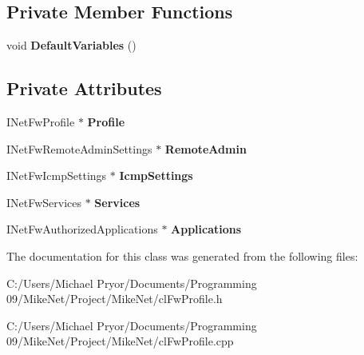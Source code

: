 \subsection*{Private Member Functions}
\begin{DoxyCompactItemize}
\item 
\hypertarget{classcl_fw_profile_a8700995a9f6c3439cbb0b1fefe321dfd}{
void {\bfseries DefaultVariables} ()}
\label{classcl_fw_profile_a8700995a9f6c3439cbb0b1fefe321dfd}

\end{DoxyCompactItemize}
\subsection*{Private Attributes}
\begin{DoxyCompactItemize}
\item 
\hypertarget{classcl_fw_profile_a06d3781f78678377746f036d6c037787}{
INetFwProfile $\ast$ {\bfseries Profile}}
\label{classcl_fw_profile_a06d3781f78678377746f036d6c037787}

\item 
\hypertarget{classcl_fw_profile_a846dde8013a31dce807a07a42bbcda24}{
INetFwRemoteAdminSettings $\ast$ {\bfseries RemoteAdmin}}
\label{classcl_fw_profile_a846dde8013a31dce807a07a42bbcda24}

\item 
\hypertarget{classcl_fw_profile_ae6a7d6ee41bee4a46061a081ba9a5bb7}{
INetFwIcmpSettings $\ast$ {\bfseries IcmpSettings}}
\label{classcl_fw_profile_ae6a7d6ee41bee4a46061a081ba9a5bb7}

\item 
\hypertarget{classcl_fw_profile_a43971b000f34c0add225d583e0ce6b1d}{
INetFwServices $\ast$ {\bfseries Services}}
\label{classcl_fw_profile_a43971b000f34c0add225d583e0ce6b1d}

\item 
\hypertarget{classcl_fw_profile_a05a7b76ddbfb99b8013c8a8943e6a7e0}{
INetFwAuthorizedApplications $\ast$ {\bfseries Applications}}
\label{classcl_fw_profile_a05a7b76ddbfb99b8013c8a8943e6a7e0}

\end{DoxyCompactItemize}


The documentation for this class was generated from the following files:\begin{DoxyCompactItemize}
\item 
C:/Users/Michael Pryor/Documents/Programming 09/MikeNet/Project/MikeNet/clFwProfile.h\item 
C:/Users/Michael Pryor/Documents/Programming 09/MikeNet/Project/MikeNet/clFwProfile.cpp\end{DoxyCompactItemize}
